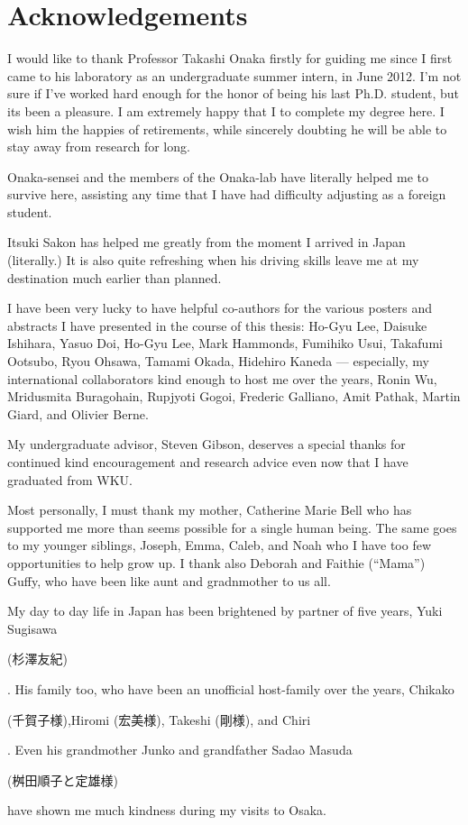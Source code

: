 \chapter*{Acknowledgements}
     I would like to thank Professor Takashi Onaka firstly for guiding me since I first came to his laboratory as an undergraduate summer intern, in June 2012. I'm not sure if I've worked hard enough for the honor of being his last Ph.D. student, but its been a pleasure. I am extremely happy that I to complete my degree here. I wish him the happies of retirements, while sincerely doubting he will be able to stay away from research for long.

     Onaka-sensei and the members of the Onaka-lab have literally helped me to survive here, assisting any time that I have had difficulty adjusting as a foreign student.

    Itsuki Sakon has helped me greatly from the moment I arrived in Japan (literally.) It is also quite refreshing when his driving skills leave me at my destination much earlier than planned.

     I have been very lucky to have helpful co-authors for the various posters and abstracts I have presented in the course of this thesis: Ho-Gyu Lee, Daisuke Ishihara, Yasuo Doi, Ho-Gyu Lee, Mark Hammonds, Fumihiko Usui, Takafumi Ootsubo, Ryou Ohsawa, Tamami Okada, Hidehiro Kaneda --- especially, my international collaborators kind enough to host me over the years, Ronin Wu, Mridusmita Buragohain, Rupjyoti Gogoi, Frederic Galliano, Amit Pathak, Martin Giard, and Olivier Berne.

     My undergraduate advisor, Steven Gibson, deserves a special thanks for continued kind encouragement and research advice even now that I have graduated from WKU.

     Most personally, I must thank my mother, Catherine Marie Bell who has supported me more than seems possible for a single human being. The same goes to my younger siblings, Joseph, Emma, Caleb, and Noah who I have too few opportunities to help grow up. I thank also Deborah and Faithie (``Mama'') Guffy, who have been like aunt and gradnmother to us all.

     My day to day life in Japan has been brightened by partner of five years, Yuki Sugisawa \begin{CJK}{UTF8}{min}(杉澤友紀)\end{CJK}. His family too, who have been an unofficial host-family over the years, Chikako \begin{CJK}{UTF8}{min}(千賀子様),Hiromi (宏美様), Takeshi (剛様), and Chiri\end{CJK}. Even his grandmother Junko and grandfather Sadao Masuda \begin{CJK}{UTF8}{min}(桝田順子と定雄様)\end{CJK} have shown me much kindness during my visits to Osaka.

